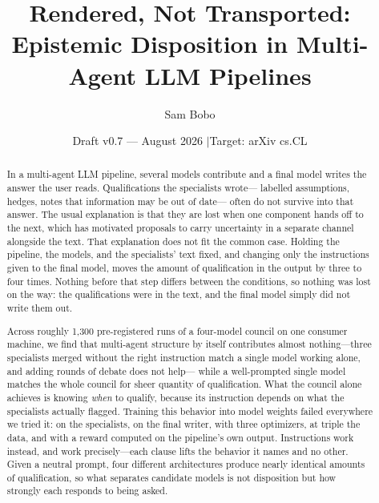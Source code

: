 \documentclass[11pt]{article}
\title{\textbf{Rendered, Not Transported:\\ Epistemic Disposition in Multi-Agent LLM Pipelines}}
\author{Sam Bobo}
\date{Draft v0.7 --- August 2026 \quad$\vert$\quad Target: arXiv cs.CL}
\begin{document}
\sloppy  %
\maketitle

\begin{abstract}
\noindent
In a multi-agent LLM pipeline, several models contribute and a final model
writes the answer the user reads. Qualifications the specialists wrote---
labelled assumptions, hedges, notes that information may be out of date---
often do not survive into that answer. The usual explanation is that they are
lost when one component hands off to the next, which has motivated proposals
to carry uncertainty in a separate channel alongside the text. That
explanation does not fit the common case. Holding the pipeline, the models,
and the specialists' text fixed, and changing only the instructions given to
the final model, moves the amount of qualification in the output by three to
four times. Nothing before that step differs between the conditions, so
nothing was lost on the way: the qualifications were in the text, and the
final model simply did not write them out.

Across roughly 1,300 pre-registered runs of a four-model council on one
consumer machine, we find that multi-agent structure by itself contributes
almost nothing---three specialists merged without the right instruction match
a single model working alone, and adding rounds of debate does not help---
while a well-prompted single model matches the whole council for sheer
quantity of qualification. What the council alone achieves is knowing
\emph{when} to qualify, because its instruction depends on what the
specialists actually flagged. Training this behavior into model weights failed
everywhere we tried it: on the specialists, on the final writer, with three
optimizers, at triple the data, and with a reward computed on the pipeline's
own output. Instructions work instead, and work precisely---each clause lifts
the behavior it names and no other. Given a neutral prompt, four different
architectures produce nearly identical amounts of qualification, so what
separates candidate models is not disposition but how strongly each responds
to being asked.
\end{abstract}
\end{document}
